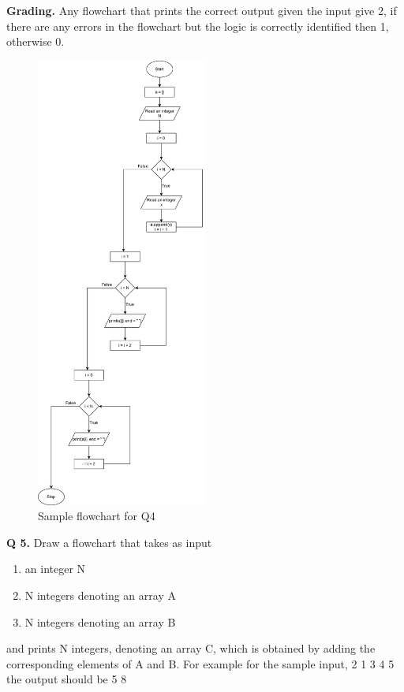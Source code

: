 \documentclass{article}
\begin{document}
        \begin{flushleft}
        
        \textbf{Grading. } Any flowchart that prints the correct output given the input give 2, if there 
        are any errors in the flowchart but the logic is correctly identified then 1, otherwise 0.
        
        \end{flushleft}
        
        \begin{figure}[ht]
            \centering
            \includegraphics[width=0.5\textwidth]{Q4.png}
            \caption{Sample flowchart for Q4}
            \label{Q4}
        \end{figure}
        
        \clearpage


\begin{flushleft}

\textbf{Q 5. } Draw a flowchart that takes as input 
\begin{enumerate}
    \item an integer N
    \item N integers denoting an array A
    \item N integers denoting an array B
\end{enumerate}
and prints N integers, denoting an array C, which is obtained by adding the corresponding elements of A and B. 
For example for the sample input,
    2
    1 3
    4 5
the output should be 
    5 8


\end{flushleft}
\end{document}
